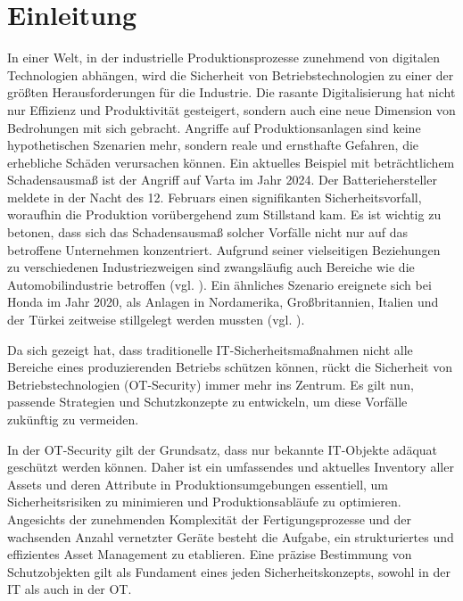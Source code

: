 \section{Einleitung}



In einer Welt, in der industrielle Produktionsprozesse zunehmend von digitalen Technologien abhängen, wird die Sicherheit von Betriebstechnologien zu einer der größten Herausforderungen für die Industrie. Die rasante Digitalisierung hat nicht nur Effizienz und Produktivität gesteigert, sondern auch eine neue Dimension von Bedrohungen mit sich gebracht. Angriffe auf Produktionsanlagen sind keine hypothetischen Szenarien mehr, sondern reale und ernsthafte Gefahren, die erhebliche Schäden verursachen können. Ein aktuelles Beispiel mit beträchtlichem Schadensausmaß ist der Angriff auf Varta im Jahr 2024. Der Batteriehersteller meldete in der Nacht des 12. Februars einen signifikanten Sicherheitsvorfall, woraufhin die Produktion vorübergehend zum Stillstand kam. Es ist wichtig zu betonen, dass sich das Schadensausmaß solcher Vorfälle nicht nur auf das betroffene Unternehmen konzentriert. Aufgrund seiner vielseitigen Beziehungen zu verschiedenen Industriezweigen sind zwangsläufig auch Bereiche wie die Automobilindustrie betroffen (vgl. \cite{VartaAngriff}). Ein ähnliches Szenario ereignete sich bei Honda im Jahr 2020, als Anlagen in Nordamerika, Großbritannien, Italien und der Türkei zeitweise stillgelegt werden mussten (vgl. \cite{HondaAngriff}). 

Da sich gezeigt hat, dass traditionelle IT-Sicherheitsmaßnahmen nicht alle Bereiche eines produzierenden Betriebs schützen können, rückt die Sicherheit von Betriebstechnologien (OT-Security) immer mehr ins Zentrum. Es gilt nun, passende Strategien und Schutzkonzepte zu entwickeln, um diese Vorfälle zukünftig zu vermeiden.

In der OT-Security gilt der Grundsatz, dass nur bekannte IT-Objekte adäquat geschützt werden können. Daher ist ein umfassendes und aktuelles Inventory aller Assets und deren Attribute in Produktionsumgebungen essentiell, um Sicherheitsrisiken zu minimieren und Produktionsabläufe zu optimieren. Angesichts der zunehmenden Komplexität der Fertigungsprozesse und der wachsenden Anzahl vernetzter Geräte besteht die Aufgabe, ein strukturiertes und effizientes Asset Management zu etablieren. Eine präzise Bestimmung von Schutzobjekten gilt als Fundament eines jeden Sicherheitskonzepts, sowohl in der IT als auch in der OT.

